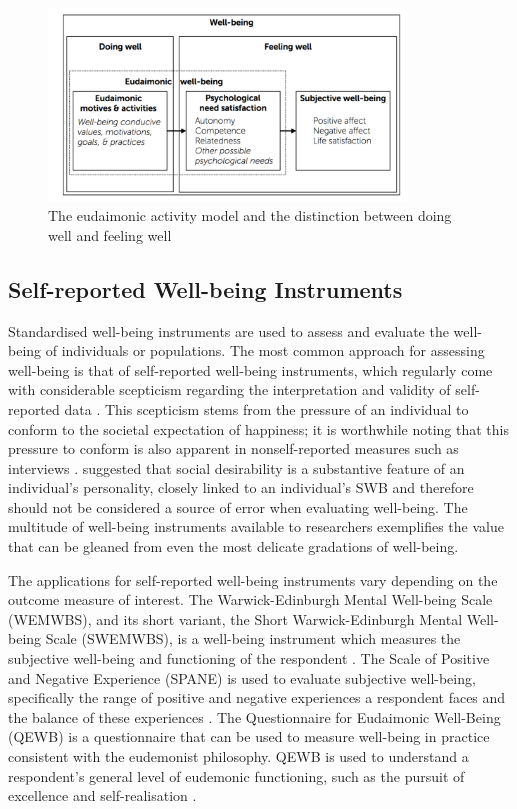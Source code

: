 \documentclass[12pt]{article}
\begin{document}
\begin{figure}[H]
    \centering
    \includegraphics[width=0.85\textwidth]{Images/EAM.png}
    \caption{The eudaimonic activity model and the distinction between doing well and feeling well}
    \label{EAM}
\end{figure}

\subsection{Self-reported Well-being Instruments}
Standardised well-being instruments are used to assess and evaluate the well-being of individuals or populations. The most common approach for assessing well-being is that of self-reported well-being instruments, which regularly come with considerable scepticism regarding the interpretation and validity of self-reported data \parencite{Sandvik2009}. This scepticism stems from the pressure of an individual to conform to the societal expectation of happiness; it is worthwhile noting that this pressure to conform is also apparent in nonself-reported measures such as interviews \parencite{diener_response_1991}. \textcite{kozma_social_1988} suggested that social desirability is a substantive feature of an individual’s personality, closely linked to an individual’s SWB and therefore should not be considered a source of error when evaluating well-being. The multitude of well-being instruments available to researchers exemplifies the value that can be gleaned from even the most delicate gradations of well-being.
 
The applications for self-reported well-being instruments vary depending on the outcome measure of interest. The Warwick-Edinburgh Mental Well-being Scale (WEMWBS), and its short variant, the Short Warwick-Edinburgh Mental Well-being Scale (SWEMWBS), is a well-being instrument which measures the subjective well-being and functioning of the respondent \parencite{clarke_warwick-edinburgh_2011}. The Scale of Positive and Negative Experience (SPANE) is used to evaluate subjective well-being, specifically the range of positive and negative experiences a respondent faces and the balance of these experiences \parencite{diener_new_2010}. The Questionnaire for Eudaimonic Well-Being (QEWB) is a questionnaire that can be used to measure well-being in practice consistent with the eudemonist philosophy. QEWB is used to understand a respondent’s general level of eudemonic functioning, such as the pursuit of excellence and self-realisation \parencite{watermanQuestionnaireEudaimonicWellBeing2010}.
\end{document}
